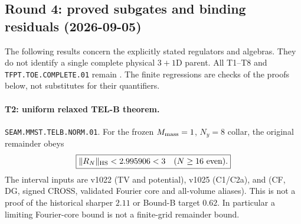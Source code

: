 \subsection*{Round 4: proved subgates and binding residuals (2026-09-05)}
\label{sec:toe-round4-proofs}
The following results concern the explicitly stated regulators and algebras.
They do not identify a single complete physical $3{+}1$D parent. All T1--T8
and \texttt{TFPT.TOE.COMPLETE.01} remain \mO. The finite regressions are
checks of the proofs below, not substitutes for their quantifiers.

\paragraph{T2: uniform relaxed TEL-B theorem.}
\texttt{SEAM.MMST.TELB.NORM.01}.
For the frozen $M_{\rm mass}=1$, $N_y=8$ collar, the original remainder
obeys
\[
 \boxed{\|R_N\|_{\rm HS}<2.995906<3\quad(N\ge16\text{ even}).}
\]
The interval inputs are v1022 (TV and potential), v1025 (C1/C2a), and
(CF, DG, signed CROSS, validated Fourier core and all-volume aliases).
This is not a proof of the historical sharper $2.11$ or Bound-B target
$0.62$. In particular a limiting Fourier-core bound is not a finite-grid
remainder bound.

